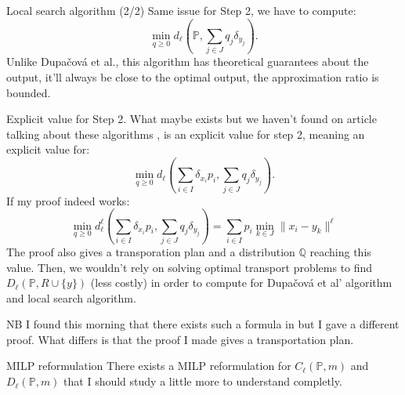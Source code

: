 \documentclass{beamer}
\theoremstyle{plain}
\begin{document}
\begin{frame}{Local search algorithm (2/2)}
    Same issue for Step 2, we have to compute:
    $$
    \min_{q\geq 0}d_\ell\left(\mathbb{P}, \sum_{j\in J}q_j\delta_{y_j}\right).
    $$
    Unlike Dupačová et al., this algorithm has theoretical guarantees about the output, it'll always be close to the optimal output, \alert{the approximation ratio is bounded.}
\end{frame}

\begin{frame}{Explicit value for Step 2.}
    What maybe exists but we haven't found on article talking about these algorithms \cite{rujeerapaiboon_scenario_2022}, \cite{bertsimas_optimization-based_2023} is an \alert{explicit value} for step 2, meaning an explicit value for: 
    $$
     \min_{q\geq 0}d_\ell\left(\sum_{i\in I}\delta_{x_i}p_i, \sum_{j\in J}q_j\delta_{y_j}\right).
    $$
    If my proof indeed works: 
    $$
    \min_{q\geq 0}d_\ell^\ell\left(\sum_{i\in I}\delta_{x_i}p_i, \sum_{j\in J}q_j\delta_{y_j}\right)=\sum_{i\in I}p_i\min_{k\in J}\lVert x_i-y_k\rVert^\ell
$$
The proof also gives \alert{a transporation plan} and a \alert{distribution $\mathbb{Q}$} reaching this value. Then, \alert{we wouldn't rely on solving optimal transport problems to find $D_\ell\left(\mathbb{P},R\cup\{y\}\right)$} (less costly) in order to compute for Dupačová et al' algorithm and local search algorithm.
\end{frame}
\begin{frame}{NB}
    I found this morning that there exists such a formula in \cite{dupacova_scenario_2003} but I gave a different proof. What differs is that the proof I made gives a transportation plan.
\end{frame}
\begin{frame}{MILP reformulation}
    There exists a MILP reformulation for \alert{$C_\ell\left(\mathbb{P},m\right)$} and \alert{$D_\ell\left(\mathbb{P},m\right)$} that I should study a little more to understand completly.
\end{frame}
\end{document}
